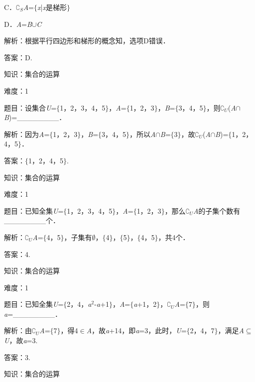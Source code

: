 \documentclass{article} %
\begin{document}
C．$\mathrm{\complement}$\textit{${}_{S}$A}=$\mathrm{\{}$\textit{x}|\textit{x}是梯形$\mathrm{\}}$

D．\textit{A}=\textit{B}$\mathrm{\cup}$\textit{C}

解析：根据平行四边形和梯形的概念知，选项D错误．

答案：D.

知识：集合的运算

难度：1

题目：设集合\textit{U}=$\mathrm{\{}$1，2，3，4，5$\mathrm{\}}$，\textit{A}=$\mathrm{\{}$1，2，3$\mathrm{\}}$，\textit{B}=$\mathrm{\{}$3，4，5$\mathrm{\}}$，则$\mathrm{\complement}$\textit{${}_{U}$}(\textit{A}$\mathrm{\cap}$\textit{B})=\_\_\_\_\_\_\_\_．

解析：因为\textit{A}=$\mathrm{\{}$1，2，3$\mathrm{\}}$，\textit{B}=$\mathrm{\{}$3，4，5$\mathrm{\}}$，所以\textit{A}$\mathrm{\cap}$\textit{B}=$\mathrm{\{}$3$\mathrm{\}}$，故$\mathrm{\complement}$\textit{${}_{U}$}(\textit{A}$\mathrm{\cap}$\textit{B})=$\mathrm{\{}$1，2，4，5$\mathrm{\}}$．

答案：$\mathrm{\{}$1，2，4，5$\mathrm{\}}$.

知识：集合的运算

难度：1

题目：已知全集\textit{U}=$\mathrm{\{}$1，2，3，4，5$\mathrm{\}}$，\textit{A}=$\mathrm{\{}$1，2，3$\mathrm{\}}$，那么$\mathrm{\complement}$\textit{${}_{U}$A}的子集个数有\_\_\_\_\_\_\_\_个．

解析：$\mathrm{\complement}$\textit{${}_{U}$A}=$\mathrm{\{}$4，5$\mathrm{\}}$，子集有$\mathrm{\emptyset}$，$\mathrm{\{}$4$\mathrm{\}}$，$\mathrm{\{}$5$\mathrm{\}}$，$\mathrm{\{}$4，5$\mathrm{\}}$，共4个．

答案：4.

知识：集合的运算

难度：1

题目：已知全集\textit{U}=$\mathrm{\{}$2，4，\textit{a}${}^{2}$-\textit{a}+1$\mathrm{\}}$，\textit{A}=$\mathrm{\{}$\textit{a}+1，2$\mathrm{\}}$，$\mathrm{\complement}$\textit{${}_{U}$A}=$\mathrm{\{}$7$\mathrm{\}}$，则\textit{a}=\_\_\_\_\_\_\_\_．

解析：由$\mathrm{\complement}$\textit{${}_{U}$A}=$\mathrm{\{}$7$\mathrm{\}}$，得4$\mathrm{\in}$\textit{A}，故\textit{a}+14，即\textit{a}=3，此时，\textit{U}=$\mathrm{\{}$2，4，7$\mathrm{\}}$，满足\textit{A}$\mathrm{\subseteq }$\textit{U}，故\textit{a}=3.

答案：3.

知识：集合的运算
\end{document}
